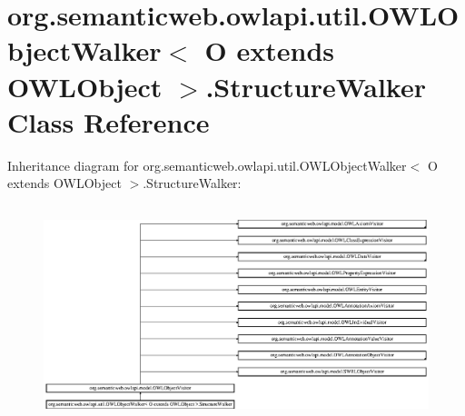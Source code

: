 \hypertarget{classorg_1_1semanticweb_1_1owlapi_1_1util_1_1_o_w_l_object_walker_3_01_o_01extends_01_o_w_l_object_01_4_1_1_structure_walker}{\section{org.\-semanticweb.\-owlapi.\-util.\-O\-W\-L\-Object\-Walker$<$ O extends O\-W\-L\-Object $>$.Structure\-Walker Class Reference}
\label{classorg_1_1semanticweb_1_1owlapi_1_1util_1_1_o_w_l_object_walker_3_01_o_01extends_01_o_w_l_object_01_4_1_1_structure_walker}
}
Inheritance diagram for org.\-semanticweb.\-owlapi.\-util.\-O\-W\-L\-Object\-Walker$<$ O extends O\-W\-L\-Object $>$.Structure\-Walker\-:\begin{figure}[H]
\begin{center}
\leavevmode
\includegraphics[height=6.339622cm]{classorg_1_1semanticweb_1_1owlapi_1_1util_1_1_o_w_l_object_walker_3_01_o_01extends_01_o_w_l_object_01_4_1_1_structure_walker}
\end{center}
\end{figure}
